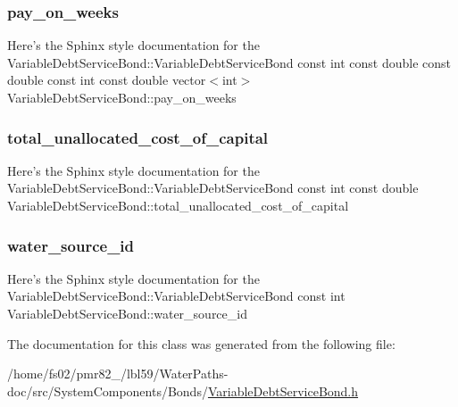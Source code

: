 \mbox{\label{classVariableDebtServiceBond_a9ba0adce7f7b3f30e14e55837424ff7c}} 
\subsubsection{\texorpdfstring{pay\+\_\+on\+\_\+weeks}{pay\_on\_weeks}}
{\footnotesize\ttfamily Here’s the Sphinx style documentation for the Variable\+Debt\+Service\+Bond\+::\+Variable\+Debt\+Service\+Bond const int const double const double const int const double vector$<$int$>$ Variable\+Debt\+Service\+Bond\+::pay\+\_\+on\+\_\+weeks}

\mbox{\label{classVariableDebtServiceBond_ac011dd32658be19f8dfc72e7d3b1e02c}} 
\subsubsection{\texorpdfstring{total\+\_\+unallocated\+\_\+cost\+\_\+of\+\_\+capital}{total\_unallocated\_cost\_of\_capital}}
{\footnotesize\ttfamily Here’s the Sphinx style documentation for the Variable\+Debt\+Service\+Bond\+::\+Variable\+Debt\+Service\+Bond const int const double Variable\+Debt\+Service\+Bond\+::total\+\_\+unallocated\+\_\+cost\+\_\+of\+\_\+capital}

\mbox{\label{classVariableDebtServiceBond_a1b43195523e5571e04f2ed558497ab6a}} 
\subsubsection{\texorpdfstring{water\+\_\+source\+\_\+id}{water\_source\_id}}
{\footnotesize\ttfamily Here’s the Sphinx style documentation for the Variable\+Debt\+Service\+Bond\+::\+Variable\+Debt\+Service\+Bond const int Variable\+Debt\+Service\+Bond\+::water\+\_\+source\+\_\+id}



The documentation for this class was generated from the following file\+:\begin{DoxyCompactItemize}
\item 
/home/fs02/pmr82\+\_/lbl59/\+Water\+Paths-\/doc/src/\+System\+Components/\+Bonds/\mbox{\hyperlink{VariableDebtServiceBond_8h}{Variable\+Debt\+Service\+Bond.\+h}}\end{DoxyCompactItemize}
